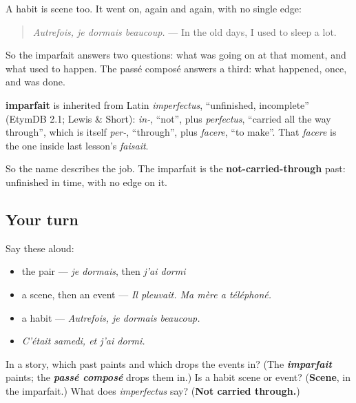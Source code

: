 \begin{grammarlens}[title={Grammar Lens: what used to happen}]
A habit is scene too. It went on, again and again, with no single edge:

\begin{quote}
\emph{Autrefois, je dormais beaucoup.} — In the old days, I used to sleep a lot.
\end{quote}

So the imparfait answers two questions: what was going on at that moment, and what used to happen. The passé composé answers a third: what happened, once, and was done.
\end{grammarlens}

\begin{cousinweb}
\textbf{imparfait} is inherited from Latin \emph{imperfectus}, \textquotedblleft{}unfinished, incomplete\textquotedblright{} (EtymDB 2.1; Lewis \& Short): \emph{in-}, \textquotedblleft{}not\textquotedblright{}, plus \emph{perfectus}, \textquotedblleft{}carried all the way through\textquotedblright{}, which is itself \emph{per-}, \textquotedblleft{}through\textquotedblright{}, plus \emph{facere}, \textquotedblleft{}to make\textquotedblright{}. That \emph{facere} is the one inside last lesson's \emph{faisait}.

So the name describes the job. The imparfait is the \textbf{not-carried-through} past: unfinished in time, with no edge on it.
\end{cousinweb}

\subsection*{Your turn}
Say these aloud:

\begin{itemize}
\raggedright
  \item the pair — \emph{je dormais}, then \emph{j'ai dormi}
  \item a scene, then an event — \emph{Il pleuvait. Ma mère a téléphoné.}
  \item a habit — \emph{Autrefois, je dormais beaucoup.}
  \item \emph{C'était samedi, et j'ai dormi.}
\end{itemize}

\begin{tcolorbox}[breakable,colback=teal!4,colframe=teal!35!black,title={Before you move on}]
In a story, which past paints and which drops the events in? (The \emph{\textbf{imparfait}} paints; the \emph{\textbf{passé composé}} drops them in.) Is a habit scene or event? (\textbf{Scene}, in the imparfait.) What does \emph{imperfectus} say? (\textbf{Not carried through.})
\end{tcolorbox}
